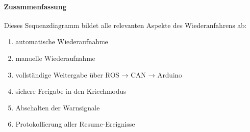 \paragraph{Zusammenfassung}

\quad Dieses Sequenzdiagramm bildet alle relevanten Aspekte des Wiederanfahrens ab:
\begin{enumerate}
    \item automatische Wiederaufnahme
    \item manuelle Wiederaufnahme
    \item vollständige Weitergabe über ROS → CAN → Arduino
    \item sichere Freigabe in den Kriechmodus
    \item Abschalten der Warnsignale
    \item Protokollierung aller Resume-Ereignisse
\end{enumerate}

